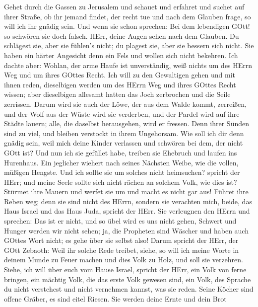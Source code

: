  Gehet durch die Gassen zu Jerusalem und schauet und
erfahret und suchet auf ihrer Straße, ob ihr jemand findet, der recht
tue und nach dem Glauben frage, so will ich ihr gnädig sein.
 Und wenn sie schon sprechen: Bei dem lebendigen GOtt! so
schwören sie doch falsch.  HErr, deine Augen sehen nach dem
Glauben. Du schlägest sie, aber sie fühlen's nicht; du plagest sie, aber
sie bessern sich nicht. Sie haben ein härter Angesicht denn ein Fels und
wollen sich nicht bekehren.  Ich dachte aber: Wohlan, der
arme Haufe ist unverständig, weiß nichts um des HErrn Weg und um ihres
GOttes Recht.  Ich will zu den Gewaltigen gehen und mit
ihnen reden, dieselbigen werden um des HErrn Weg und ihres GOttes Recht
wissen; aber dieselbigen allesamt hatten das Joch zerbrochen und die
Seile zerrissen.  Darum wird sie auch der Löwe, der aus dem
Walde kommt, zerreißen, und der Wolf aus der Wüste wird sie verderben,
und der Pardel wird auf ihre Städte lauern; alle, die daselbst
herausgehen, wird er fressen. Denn ihrer Sünden sind zu viel, und
bleiben verstockt in ihrem Ungehorsam.  Wie soll ich dir
denn gnädig sein, weil mich deine Kinder verlassen und schwören bei dem,
der nicht GOtt ist? Und nun ich sie gefüllet habe, treiben sie Ehebruch
und laufen ins Hurenhaus.  Ein jeglicher wiehert nach seines
Nächsten Weibe, wie die vollen, müßigen Hengste.  Und ich
sollte sie um solches nicht heimsuchen? spricht der HErr; und meine
Seele sollte sich nicht rächen an solchem Volk, wie dies ist?
 Stürmet ihre Mauern und werfet sie um und macht es nicht
gar aus! Führet ihre Reben weg; denn sie sind nicht des HErrn,
 sondern sie verachten mich, beide, das Haus Israel und das
Haus Juda, spricht der HErr.  Sie verleugnen den HErrn und
sprechen: Das ist er nicht, und so übel wird es uns nicht gehen, Schwert
und Hunger werden wir nicht sehen;  ja, die Propheten sind
Wäscher und haben auch GOttes Wort nicht; es gehe über sie selbst also!
 Darum spricht der HErr, der GOtt Zebaoth: Weil ihr solche
Rede treibet, siehe, so will ich meine Worte in deinem Munde zu Feuer
machen und dies Volk zu Holz, und soll sie verzehren. 
Siehe, ich will über euch vom Hause Israel, spricht der HErr, ein Volk
von ferne bringen, ein mächtig Volk, die das erste Volk gewesen sind,
ein Volk, des Sprache du nicht verstehest und nicht vernehmen kannst,
was sie reden.  Seine Köcher sind offene Gräber, es sind
eitel Riesen.  Sie werden deine Ernte und dein Brot
